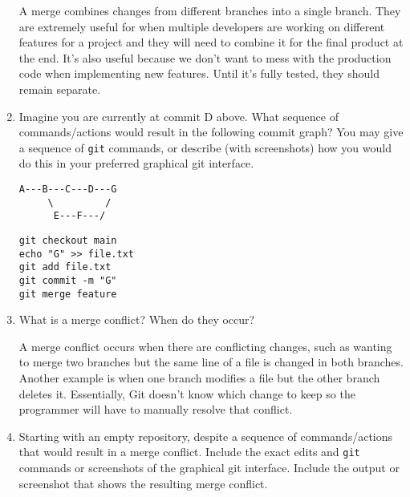 \documentclass[10pt,twocolumn]{article}
\begin{document}
\begin{enumerate}
A merge combines changes from different branches into a single branch. They are extremely useful for when multiple developers are working on different features for a project and they will need to combine it for the final product at the end. It's also useful because we don't want to mess with the production code when implementing new features. Until it's fully tested, they should remain separate.
\item Imagine you are currently at commit D above. What sequence of commands/actions would result in the following commit graph? You may give a sequence of \texttt{git} commands, or describe (with screenshots) how you would do this in your preferred graphical git interface.
\begin{verbatim}
A---B---C---D---G
     \         /
      E---F---/
\end{verbatim}

\texttt{git checkout main}\\
\texttt{echo "G" >> file.txt}\\
\texttt{git add file.txt}\\
\texttt{git commit -m "G"}\\
\texttt{git merge feature}\\
\item What is a merge conflict? When do they occur?

A merge conflict occurs when there are conflicting changes, such as wanting to merge two branches but the same line of a file is changed in both branches. Another example is when one branch modifies a file but the other branch deletes it. Essentially, Git doesn't know which change to keep so the programmer will have to manually resolve that conflict.
\item Starting with an empty repository, despite a sequence of commands/actions that would result in a merge conflict. Include the exact edits and \texttt{git} commands or screenshots of the graphical git interface. Include the output or screenshot that shows the resulting merge conflict.\\


\end{enumerate}
\end{document}
